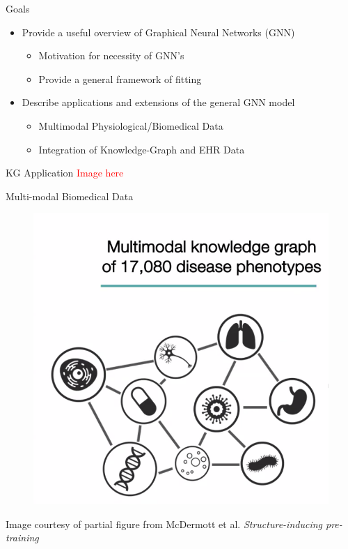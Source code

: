\documentclass{beamer}
\begin{document}
\begin{frame}{Goals}
    \begin{itemize}\setlength\itemsep{8mm}
        \item Provide a useful overview of Graphical Neural Networks (GNN)
        \begin{itemize}
            \item Motivation for necessity of GNN's 
            \item Provide a general framework of fitting 
        \end{itemize}
        \item Describe applications and extensions of the general GNN model 
        \begin{itemize}
            \item Multimodal Physiological/Biomedical Data
            \item Integration of Knowledge-Graph and EHR Data
        \end{itemize}
    \end{itemize}
\end{frame}


\begin{frame}{KG Application}
    \textcolor{red}{Image here}
\end{frame}

\begin{frame}{Multi-modal Biomedical Data}
    \begin{figure}
        \centering 
        \includegraphics[scale=0.2]{MultimodalPreview.png}
    \end{figure}
    Image courtesy of partial figure from McDermott et al. {\it Structure-inducing pre-training} \cite{mcdermott_structure-inducing_2023}
\end{frame}
\end{document}
